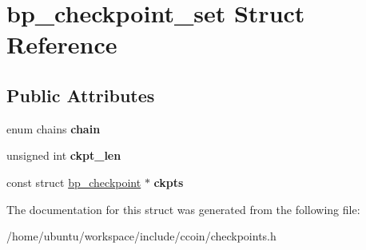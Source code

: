 \hypertarget{structbp__checkpoint__set}{\section{bp\-\_\-checkpoint\-\_\-set Struct Reference}
\label{structbp__checkpoint__set}
}
\subsection*{Public Attributes}
\begin{DoxyCompactItemize}
\item 
\hypertarget{structbp__checkpoint__set_a6790e6288cf04ab5ab3e1f24d7168ef5}{enum chains {\bfseries chain}}\label{structbp__checkpoint__set_a6790e6288cf04ab5ab3e1f24d7168ef5}

\item 
\hypertarget{structbp__checkpoint__set_abc1d781d63d6cb10a0f1fa096a0cd1ad}{unsigned int {\bfseries ckpt\-\_\-len}}\label{structbp__checkpoint__set_abc1d781d63d6cb10a0f1fa096a0cd1ad}

\item 
\hypertarget{structbp__checkpoint__set_aa777a5c9a4fe9c05c372a17d058622ac}{const struct \hyperlink{structbp__checkpoint}{bp\-\_\-checkpoint} $\ast$ {\bfseries ckpts}}\label{structbp__checkpoint__set_aa777a5c9a4fe9c05c372a17d058622ac}

\end{DoxyCompactItemize}


The documentation for this struct was generated from the following file\-:\begin{DoxyCompactItemize}
\item 
/home/ubuntu/workspace/include/ccoin/checkpoints.\-h\end{DoxyCompactItemize}
